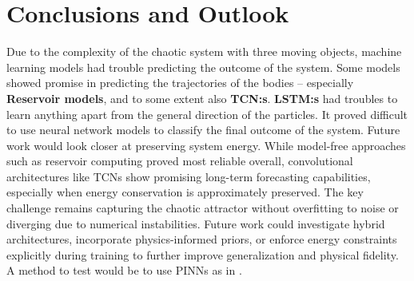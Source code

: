 \documentclass[%
 reprint,
 amsmath,amssymb,
 aps,
]{revtex4-2}
\begin{document}

\section{\label{sec:conclusion}Conclusions and Outlook} %


Due to the complexity of the chaotic system with three moving objects, machine learning models had trouble predicting the outcome of the system. 
Some models showed promise in predicting the trajectories of the bodies -- especially \textbf{Reservoir models}, and to some extent also \textbf{TCN:s}. \textbf{LSTM:s} had troubles to learn anything apart from the general direction of the particles. It proved difficult to use neural network models to classify the final outcome of the system.
Future work would look closer at preserving system energy.
While model-free approaches such as reservoir computing proved most reliable overall, convolutional architectures like TCNs show promising long-term forecasting capabilities, especially when energy conservation is approximately preserved. The key challenge remains capturing the chaotic attractor without overfitting to noise or diverging due to numerical instabilities. Future work could investigate hybrid architectures, incorporate physics-informed priors, or enforce energy constraints explicitly during training to further improve generalization and physical fidelity. A method to test would be to use PINNs as in \cite{RAISSI2019686}.
\end{document}
